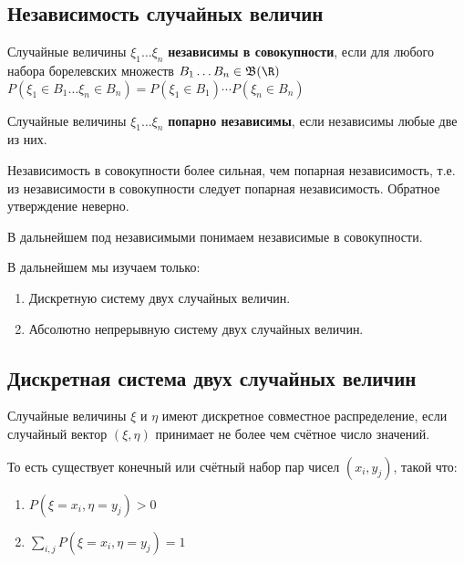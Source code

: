 \subsection{Независимость случайных величин}

\begin{definition}
    Случайные величины \(\xi_1 \dots \xi_n\) \textbf{независимы в совокупности}, если для любого набора борелевских множеств \(B_1 \dots B_n \in \mathfrak{B}(\R)\) \(P(\xi_1 \in B_1 \dots \xi_n \in B_n) = P(\xi_1 \in B_1) \cdots P(\xi_n \in B_n)\)
\end{definition}

\begin{definition}
    Случайные величины \(\xi_1 \dots \xi_n\) \textbf{попарно независимы}, если независимы любые две из них.
\end{definition}

\begin{remark}
    Независимость в совокупности более сильная, чем попарная независимость, т.е. из независимости в совокупности следует попарная независимость. Обратное утверждение неверно.
\end{remark}

\begin{remark}
    В дальнейшем под независимыми понимаем независимые в совокупности.
\end{remark}

\begin{remark}
    В дальнейшем мы изучаем только:
    \begin{enumerate}
        \item Дискретную систему двух случайных величин.
        \item Абсолютно непрерывную систему двух случайных величин.
    \end{enumerate}
\end{remark}

\subsection{Дискретная система двух случайных величин}

\begin{definition}
    Случайные величины \(\xi\) и \(\eta\) имеют дискретное совместное распределение, если случайный вектор \((\xi, \eta)\) принимает не более чем счётное число значений.
\end{definition}

То есть существует конечный или счётный набор пар чисел \((x_i, y_j)\), такой что:
\begin{enumerate}
    \item \(P(\xi = x_i, \eta = y_j) > 0\)
    \item \(\sum_{i, j} P(\xi = x_i, \eta = y_j) = 1\)
\end{enumerate}

